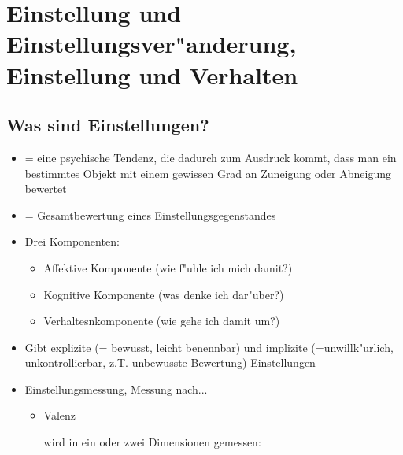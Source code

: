 \section{Einstellung und Einstellungsver"anderung, Einstellung und Verhalten}
\subsection{Was sind Einstellungen?}
\begin{itemize}
	\item
		= eine psychische Tendenz, die dadurch zum Ausdruck kommt, dass man ein bestimmtes Objekt mit einem gewissen Grad an Zuneigung oder Abneigung bewertet
	\item
		= Gesamtbewertung eines Einstellungsgegenstandes
	\item
		Drei Komponenten:
		\begin{itemize}
			\item
				Affektive Komponente (wie f"uhle ich mich damit?)
			\item
				Kognitive Komponente (was denke ich dar"uber?)
			\item
				Verhaltesnkomponente (wie gehe ich damit um?)
		\end{itemize}
	\item
		Gibt explizite (= bewusst, leicht benennbar) und implizite (=unwillk"urlich, unkontrollierbar, z.T. unbewusste Bewertung)  Einstellungen
	\item
		Einstellungsmessung, Messung nach... 
		\begin{itemize}
			\item Valenz 

				wird in ein oder zwei Dimensionen gemessen: \\



\end{itemize}
\end{itemize}
